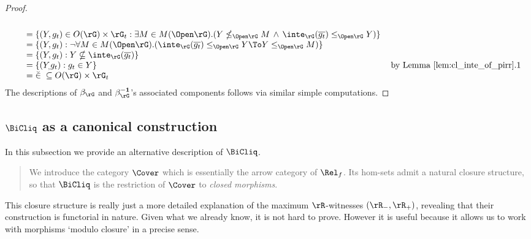 \documentclass{article}
\begin{document}
\begin{proof}
\[\begin{tabular}{lll}
\\&
$= \{ (Y,g_t) \in O(\rG) \times \rG_t : \exists M \in M(\Open\rG).( Y \nleq_{\Open\rG} M \,\land\, \inte_\rG(\overline{g_t}) \leq_{\Open\rG} Y)  \}$
\\&
$= \{ (Y,g_t) : \neg\forall M \in M(\Open\rG).(\inte_\rG(\overline{g_t}) \leq_{\Open\rG} Y \To Y \leq_{\Open\rG} M)  \}$
\\&
$= \{ (Y,g_t)  : Y \nsubseteq \inte_\rG(\overline{g_t}) \}$
\\&
$= \{ (Y_,g_t)  : g_t \in Y\}$
& by Lemma \ref{lem:cl_inte_of_pirr}.1
\\&
$= \breve{\in} \; \subseteq O(\rG) \times \rG_t$
\end{tabular}
\]
The descriptions of $\beta_\rG$ and $\beta_\rG^{\bf-1}$'s associated components follows via similar simple computations.
\end{proof}


\subsection{$\BiCliq$ as a canonical construction}

In this subsection we provide an alternative description of $\BiCliq$.

\begin{quote}
We introduce the category $\Cover$ which is essentially the arrow category of $\Rel_f$. Its hom-sets admit a natural closure structure, so that $\BiCliq$ is the restriction of $\Cover$ to \emph{closed morphisms}.
\end{quote}

This closure structure is really just a more detailed explanation of the maximum $\rR$-witnesses $(\rR_-,\rR_+)$, revealing that their construction is functorial in nature. Given what we already know, it is not hard to prove. However it is useful because it allows us to work with morphisms `modulo closure' in a precise sense. 
\end{document}
